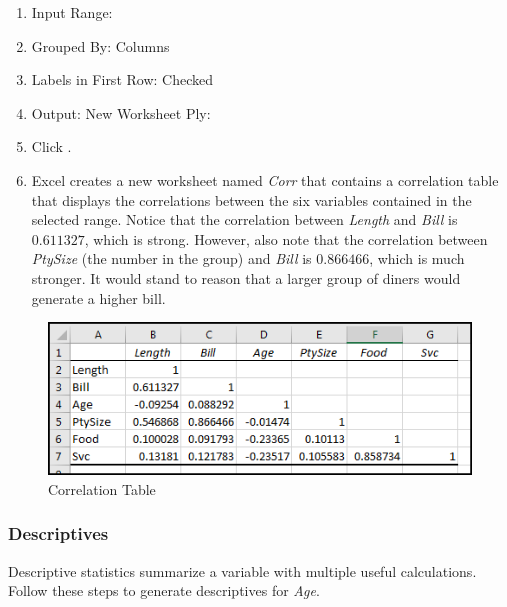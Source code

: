 \begin{enumbox}
\begin{enumerate}
		\item Input Range: 
		\item Grouped By: Columns
		\item Labels in First Row: Checked
		\item Output: New Worksheet Ply: 
		\item Click .
		\item Excel creates a new worksheet named \textit{Corr} that contains a correlation table that displays the correlations between the six variables contained in the selected range. Notice that the correlation between \textit{Length} and \textit{Bill} is $ 0.611327 $, which is strong. However, also note that the correlation between \textit{PtySize} (the number in the group) and \textit{Bill} is $ 0.866466 $, which is much stronger. It would stand to reason that a larger group of diners would generate a higher bill.
	\end{enumerate}
\end{enumbox}

\begin{figure}[H]
	\centering
	\includegraphics[width=\maxwidth{.95\linewidth}]{gfx/ch09_fig56}
	\caption{Correlation Table}
	\label{09:fig56}
\end{figure}

\subsubsection{Descriptives}

Descriptive statistics summarize a variable with multiple useful calculations. Follow these steps to generate descriptives for \textit{Age}.

